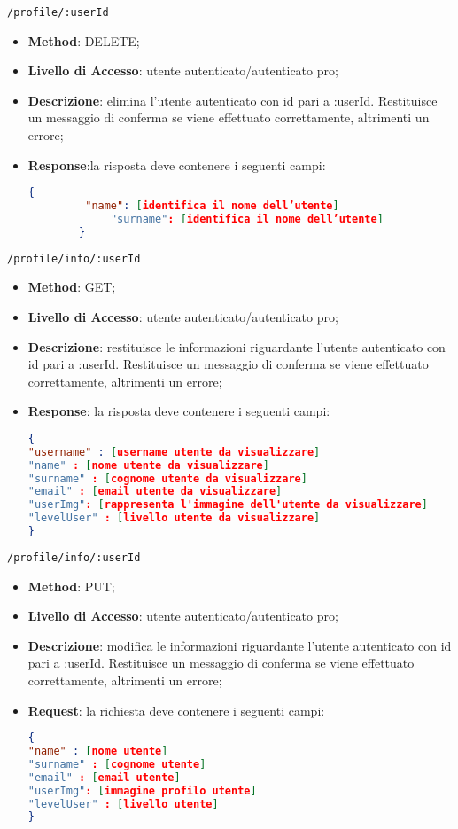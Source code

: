 \item \texttt{/profile/:userId}
	\begin{itemize}
		\item \textbf{Method}: DELETE;
		\item \textbf{Livello di Accesso}: utente autenticato/autenticato pro;
		\item \textbf{Descrizione}: elimina l'utente autenticato con id pari a :userId. 		Restituisce un messaggio di conferma se viene effettuato correttamente, altrimenti un errore;
		\item \textbf{Response}:la risposta deve contenere i seguenti campi:
		\begin{lstlisting}[language=json,firstnumber=1]{
   		 "name": [identifica il nome dell’utente]
    		 "surname": [identifica il nome dell’utente]
		}
		\end{lstlisting}
	\end{itemize}	
	
	\item \texttt{/profile/info/:userId}
		\begin{itemize}
			\item \textbf{Method}: GET;
			\item \textbf{Livello di Accesso}: utente autenticato/autenticato pro;
			\item \textbf{Descrizione}: restituisce le informazioni riguardante l'utente autenticato con id pari a :userId. Restituisce un messaggio di conferma se viene
effettuato correttamente, altrimenti un errore;
			\item \textbf{Response}: la risposta deve contenere i seguenti campi:
\begin{lstlisting}[language=json,firstnumber=1]
{
"username" : [username utente da visualizzare]
"name" : [nome utente da visualizzare]
"surname" : [cognome utente da visualizzare]
"email" : [email utente da visualizzare]
"userImg": [rappresenta l'immagine dell'utente da visualizzare]
"levelUser" : [livello utente da visualizzare]
}
\end{lstlisting}
		\end{itemize}
		
	\item \texttt{/profile/info/:userId}
		\begin{itemize}
			\item \textbf{Method}: PUT;
			\item \textbf{Livello di Accesso}: utente autenticato/autenticato pro;
			\item \textbf{Descrizione}: modifica le informazioni riguardante l'utente autenticato con id pari a :userId. Restituisce un messaggio di conferma se viene
effettuato correttamente, altrimenti un errore;
			\item \textbf{Request}: la richiesta deve contenere i seguenti campi:
\begin{lstlisting}[language=json,firstnumber=1]
{
"name" : [nome utente]
"surname" : [cognome utente]
"email" : [email utente]
"userImg": [immagine profilo utente]
"levelUser" : [livello utente]
}
\end{lstlisting}
		\end{itemize}	
		
